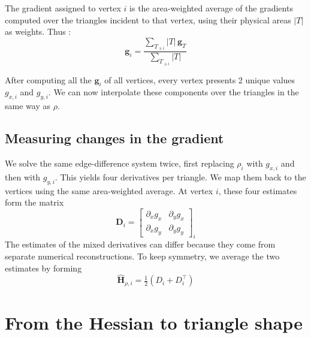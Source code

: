\documentclass[11pt,a4paper]{article}
\begin{document}
\noindent
The gradient assigned to vertex $i$ is the area-weighted average of the gradients computed over the triangles incident to that vertex, using their physical areas $|T|$ as weights. Thus :
\begin{equation}
    \boxed{
  \mathbf g_i=
  \frac{\sum_{T_{\ni i}}\lvert T\rvert\,\mathbf g_T}
       {\sum_{T_{\ni i}}\lvert T\rvert}}
\end{equation}

\noindent
After computing all the $\mathbf g_i$ of all vertices, every vertex presents 2 unique values $g_{x,i}$ and $g_{y,i}$. We can now interpolate these components over the triangles in the same way as \(\rho\).



\subsection{Measuring changes in the gradient}

We solve the same edge-difference system twice, first replacing
\(\rho_i\) with \(g_{x,i}\) and then with \(g_{y,i}\). This yields four
derivatives per triangle. We map them back to the vertices using the
same area-weighted average. At vertex \(i\), these four estimates form
the matrix
\begin{equation}
  \mathbf{D}_i =
  \begin{bmatrix}
    \partial_x g_x & \partial_y g_x\\
    \partial_x g_y & \partial_y g_y
  \end{bmatrix}_{\!i}
\end{equation}
The estimates of the mixed derivatives can differ because they come
from separate numerical reconstructions. To keep symmetry, we average the two estimates
by forming
\begin{equation}
    \boxed{\widehat{\mathbf{H}}_{\rho,i}=\tfrac12(D_i+D_i^\top)}
\end{equation}

\section{From the Hessian to triangle shape}
\end{document}
